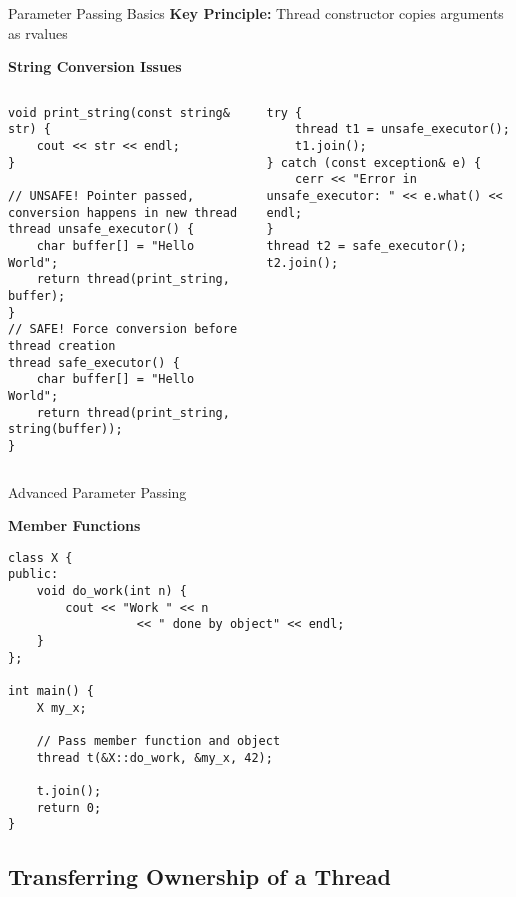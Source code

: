 \begin{frame}[fragile]{Parameter Passing Basics}
	\textbf{Key Principle:} Thread constructor copies arguments as rvalues

	\textbf{String Conversion Issues}
	\begin{columns}
		\begin{column}{0.6\textwidth}
			\begin{verbatim}
void print_string(const string& str) {
    cout << str << endl;
}

// UNSAFE! Pointer passed, conversion happens in new thread
thread unsafe_executor() {
    char buffer[] = "Hello World";
    return thread(print_string, buffer);
}
// SAFE! Force conversion before thread creation
thread safe_executor() {
    char buffer[] = "Hello World";
    return thread(print_string, string(buffer));
}
			\end{verbatim}
		\end{column}
		\begin{column}{0.4\textwidth}
			\begin{verbatim}
try {
    thread t1 = unsafe_executor();
    t1.join();
} catch (const exception& e) {
    cerr << "Error in unsafe_executor: " << e.what() << endl;
}
thread t2 = safe_executor();
t2.join();
			\end{verbatim}
		\end{column}
	\end{columns}
\end{frame}

\begin{frame}[fragile]{Advanced Parameter Passing}

	\textbf{Member Functions}
	\begin{verbatim}
class X {
public:
    void do_work(int n) {
        cout << "Work " << n
                  << " done by object" << endl;
    }
};

int main() {
    X my_x;

    // Pass member function and object
    thread t(&X::do_work, &my_x, 42);

    t.join();
    return 0;
}
			\end{verbatim}
\end{frame}

\subsection{Transferring Ownership of a Thread}

